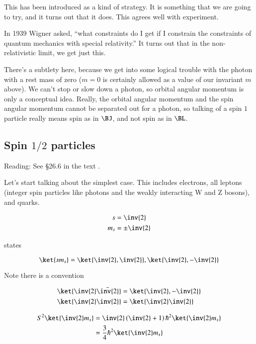 This has been introduced as a kind of strategy.  It is something that we are going to try, and it turns out that it does.  This agrees well with experiment.

In 1939 Wigner asked, ``what constraints do I get if I constrain the constraints of quantum mechanics with special relativity.''  It turns out that in the non-relativistic limit, we get just this.

There's a subtlety here, because we get into some logical trouble with the photon with a rest mass of zero ($m = 0$ is certainly allowed as a value of our invariant $m$ above).  We can't stop or slow down a photon, so orbital angular momentum is only a conceptual idea.  Really, the orbital angular momentum and the spin angular momentum cannot be separated out for a photon, so talking of a spin $1$ particle really means spin as in $\BJ$, and not spin as in $\BL$.

\subsection{Spin $1/2$ particles}

Reading: See \S 26.6 in the text \cite{desai2009quantum}.

Let's start talking about the simplest case.  This includes electrons, all leptons (integer spin particles like photons and the weakly interacting W and Z bosons), and quarks.

\begin{align}\label{eqn:qmTwoL13:410}
s &= \inv{2} \\
m_s &= \pm \inv{2}
\end{align}

states

\begin{equation}\label{eqn:qmTwoL13:430}
\ket{s m_s} = \ket{ \inv{2}, \inv{2} },\ket{ \inv{2}, -\inv{2} }
\end{equation}

Note there is a convention

\begin{align}\label{eqn:qmTwoL13:450}
\ket{ \inv{2} \bar{\inv{2}} } &= \ket{ \inv{2}, -\inv{2} } \\
\ket{ \inv{2} \inv{2} } &= \ket{ \inv{2} \inv{2} }
\end{align}

\begin{equation}\label{eqn:qmTwoL13:470}
\begin{aligned}
S^2 
\ket{\inv{2} m_s} 
&= 
\inv{2} \left( \inv{2} + 1 \right) \hbar^2 
\ket{\inv{2} m_s}  \\
&=
\frac{3}{4} \hbar^2 \ket{\inv{2} m_s}  \\
\end{aligned}
\end{equation}

